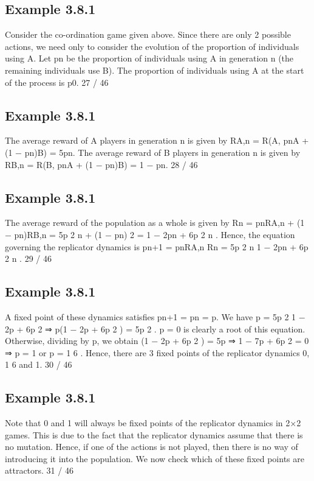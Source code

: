 \documentclass[]{report}
\begin{document}
\subsection{Example 3.8.1}
Consider the co-ordination game given above.
Since there are only 2 possible actions, we need only to consider
the evolution of the proportion of individuals using A.
Let pn be the proportion of individuals using A in generation n (the
remaining individuals use B). The proportion of individuals using A
at the start of the process is p0.
27 / 46

\subsection{Example 3.8.1}
The average reward of A players in generation n is given by
RA,n = R(A, pnA + (1 − pn)B) = 5pn.
The average reward of B players in generation n is given by
RB,n = R(B, pnA + (1 − pn)B) = 1 − pn.
28 / 46
\subsection{Example 3.8.1}
The average reward of the population as a whole is given by
Rn = pnRA,n + (1 − pn)RB,n = 5p
2
n + (1 − pn)
2 = 1 − 2pn + 6p
2
n
.
Hence, the equation governing the replicator dynamics is
pn+1 =
pnRA,n
Rn
=
5p
2
n
1 − 2pn + 6p
2
n
.
29 / 46

\subsection{Example 3.8.1}
A fixed point of these dynamics satisfies pn+1 = pn = p. We have
p =
5p
2
1 − 2p + 6p
2 ⇒ p(1 − 2p + 6p
2
) = 5p
2
.
p = 0 is clearly a root of this equation. Otherwise, dividing by p,
we obtain
(1 − 2p + 6p
2
) = 5p ⇒ 1 − 7p + 6p
2 = 0 ⇒ p = 1 or p =
1
6
.
Hence, there are 3 fixed points of the replicator dynamics 0, 1
6
and
1.
30 / 46

\subsection{Example 3.8.1}
Note that 0 and 1 will always be fixed points of the replicator
dynamics in 2×2 games.
This is due to the fact that the replicator dynamics assume that
there is no mutation. Hence, if one of the actions is not played,
then there is no way of introducing it into the population.
We now check which of these fixed points are attractors.
31 / 46
\end{document}
